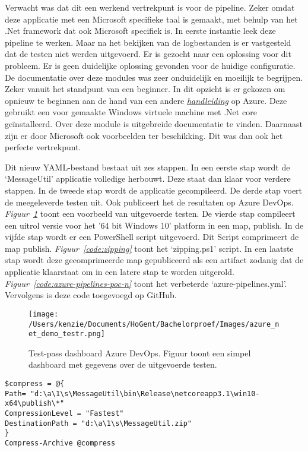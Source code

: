 Verwacht was dat dit een werkend vertrekpunt is voor de pipeline. Zeker omdat deze applicatie met een Microsoft specifieke taal is gemaakt, met behulp van het .Net framework dat ook Microsoft specifiek is. In eerste instantie leek deze pipeline te werken. Maar na het bekijken van de logbestanden is er vastgesteld dat de testen niet werden uitgevoerd. Er is gezocht naar een oplossing voor dit probleem. Er is geen duidelijke oplossing gevonden voor de huidige configuratie. De documentatie over deze modules was zeer onduidelijk en moeilijk te begrijpen. Zeker vanuit het standpunt van een beginner. In dit opzicht is er gekozen om opnieuw te beginnen aan de hand van een andere \emph{\href{https://docs.microsoft.com/en-us/azure/devops/pipelines/ecosystems/dotnet-core?view=azure-devops}{handleiding}} op Azure. Deze gebruikt een voor gemaakte Windows virtuele machine met .Net core geïnstalleerd. Over deze module is uitgebreide documentatie te vinden. Daarnaast zijn er door Microsoft ook voorbeelden ter beschikking. Dit was dan ook het perfecte vertrekpunt.

Dit nieuw YAML-bestand bestaat uit zes stappen. In een eerste stap wordt de ‘MessageUtil’ applicatie volledige herbouwt. Deze staat dan klaar voor verdere stappen. In de tweede stap wordt de applicatie gecompileerd. De derde stap voert de meegeleverde testen uit. Ook publiceert het de resultaten op Azure DevOps. \emph{Figuur~\ref{fig:Azure_POC_testr}} toont een voorbeeld van uitgevoerde testen. De vierde stap compileert een uitrol versie voor het '64 bit Windows 10' platform in een map, publish. In de vijfde stap wordt er een PowerShell script uitgevoerd. Dit Script comprimeert de map publish. \emph{Figuur~\ref{code:zipping}} toont het ‘zipping.ps1’ script. In een laatste stap wordt deze gecomprimeerde map gepubliceerd als een artifact zodanig dat de applicatie klaarstaat om in een latere stap te worden uitgerold. \emph{Figuur~\ref{code:azure-pipelines-poc-n}} toont het verbeterde ‘azure-pipelines.yml’. Vervolgens is deze code toegevoegd op GitHub.

\begin{figure}[!htbp]
    \centering
    \texttt{[image: /Users/kenzie/Documents/HoGent/Bachelorproef/Images/azure\_net\_demo\_testr.png]}
    \caption{Test-pass dashboard Azure DevOps. Figuur toont een simpel dashboard met gegevens over de uitgevoerde testen.}
    \label{fig:Azure_POC_testr}
\end{figure}

\begin{lstlisting}
$compress = @{
Path= "d:\a\1\s\MessageUtil\bin\Release\netcoreapp3.1\win10-x64\publish\*"
CompressionLevel = "Fastest"
DestinationPath = "d:\a\1\s\MessageUtil.zip"
}
Compress-Archive @compress
\end{lstlisting}

